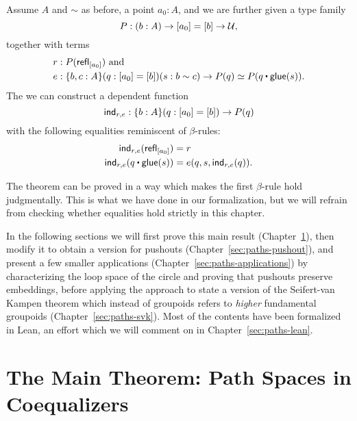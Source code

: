 \begin{thm}\label{thm:paths-main-thm}
Assume $A$ and $\sim$ as before, a point $a_0 : A$, and we are further given
a type family
\begin{equation*}
P : (b : A) \to [a_0] = [b] \to \mathcal{U} \text{,}
\end{equation*}
together with terms
\begin{align*}
r &: P(\refl_{[a_0]}) \text{ and} \\
e &: \{b, c : A\}(q : [a_0] = [b])(s : b \sim c) \to P(q) \simeq P(q \ct \glue(s)) \text{.}
\end{align*}
The we can construct a dependent function
\begin{equation*}
\mathsf{ind}_{r, e} : \{b : A\}(q : [a_0] = [b]) \to P(q)
\end{equation*}
with the following equalities reminiscent of $\beta$-rules:
\begin{align}
\ind_{r,e} (\refl_{[a_0]}) &= r \label{eq:paths-thm-based-first-beta} \\
\ind_{r,e}(q \ct \glue(s)) &= e (q,s, \mathsf{ind}_{r,e}(q)) \label{eq:paths-thm-based-second-beta} \text{.}
\end{align}
\end{thm}

\begin{remark}
The theorem can be proved in a way which makes the first $\beta$-rule hold judgmentally.
This is what we have done in our formalization, but we will refrain from checking
whether equalities hold strictly in this chapter.
\end{remark}

In the following sections we will first prove this main result (Chapter~\ref{sec:paths-main}),
then modify it to obtain a version for pushouts (Chapter~\ref{sec:paths-pushout}),
and present a few smaller applications (Chapter~\ref{sec:paths-applications})
by characterizing the loop space of the circle and proving that
pushouts preserve embeddings,
before applying the approach to state a version of the Seifert-van Kampen theorem
which instead of groupoids refers to \emph{higher} fundamental groupoids
(Chapter~\ref{sec:paths-svk}).
Most of the contents have been formalized in Lean, an effort which we will
comment on in Chapter~\ref{sec:paths-lean}.

\section{The Main Theorem: Path Spaces in Coequalizers}\label{sec:paths-main}

